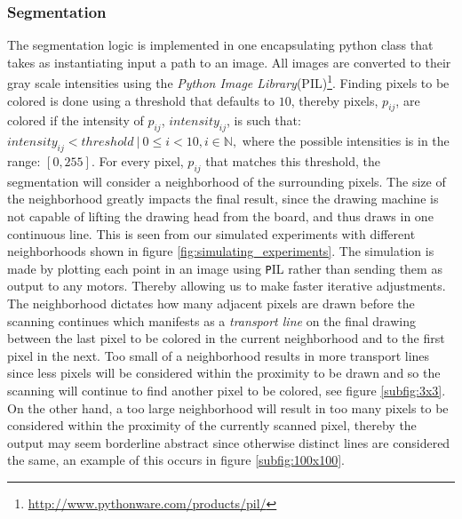 \subsubsection{Segmentation}
The segmentation logic is implemented in one encapsulating python class that takes as instantiating input a path to an image. All images are converted to their gray scale intensities using the {\it Python Image Library}(PIL)\footnote{\url{http://www.pythonware.com/products/pil/}}. Finding pixels to be colored is done using a threshold that defaults to $10$, thereby pixels, $p_{ij}$, are colored if the intensity of $p_{ij}$, $intensity_{ij}$, is such that:
\newline
$intensity_{ij} < threshold\ |\ {0 \leq i < 10, i \in \mathbb{N}}, $
\newline
where the possible intensities is in the range: $[0, 255]$.
For every pixel, $p_{ij}$ that matches this threshold, the segmentation will consider a neighborhood of the surrounding pixels. The size of the neighborhood greatly impacts the final result, since the drawing machine is not capable of lifting the drawing head from the board, and thus draws in one continuous line. This is seen from our simulated experiments with different neighborhoods shown in figure \ref{fig:simulating_experiments}. The simulation is made by plotting each point in an image using {\texttt PIL} rather than sending them as output to any motors. Thereby allowing us to make faster iterative adjustments.
The neighborhood dictates how many adjacent pixels are drawn before the scanning continues which manifests as a {\it transport line} on the final drawing between the last pixel to be colored in the current neighborhood and to the first pixel in the next. Too small of a neighborhood results in more transport lines since less pixels will be considered within the proximity to be drawn and so the scanning will continue to find another pixel to be colored, see figure \ref{subfig:3x3}. On the other hand, a too large neighborhood will result in too many pixels to be considered within the proximity of the currently scanned pixel, thereby the output may seem borderline abstract since otherwise distinct lines are considered the same, an example of this occurs in figure \ref{subfig:100x100}.
